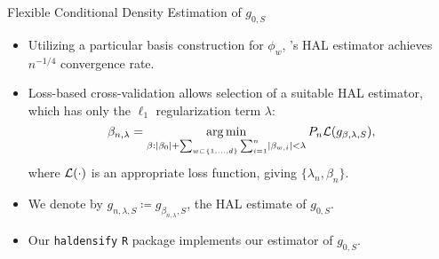 \documentclass{beamer}
\begin{document}
\begin{frame}[c]{Flexible Conditional Density Estimation of $g_{0,S}$}

\begin{center}
\begin{itemize}
  \itemsep8pt
  \item Utilizing a particular basis construction for $\phi_w$,
    \citet{vdl2017generally}'s HAL estimator achieves $n^{-1/4}$
    convergence rate\footnotemark.
  \item Loss-based cross-validation allows selection of a suitable HAL
    estimator, which has only the $\ell_1$ regularization term $\lambda$:
    {\small{
    \begin{equation*}
      \beta_{n, \lambda}= \operatorname*{arg\,min}_{\beta: \lvert \beta_0 \rvert + \sum_{w
        \subset\{1,\ldots,d\}} \sum_{i=1}^{n} \lvert \beta_{w,i} \rvert <
        \lambda} P_n \mathcal{L}(g_{\beta,\lambda,S}),
    \end{equation*} }
    }
    where $\mathcal{L}(\cdot)$ is an appropriate loss function, giving
    $\{\lambda_n, \beta_n\}$.
  \item We denote by $g_{n,\lambda,S} \coloneqq g_{\beta_{n, \lambda},S}$, the
    HAL estimate of $g_{0,S}$.
  \item Our \texttt{haldensify} \texttt{R} package implements our estimator of
    $g_{0,S}$.
\end{itemize}
\end{center}



\end{frame}

\end{document}
